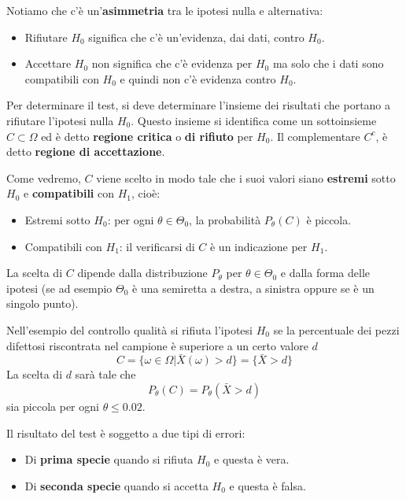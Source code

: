 \begin{observation}
	Notiamo che c'è un'\textbf{asimmetria} tra le ipotesi nulla e alternativa:
	\begin{itemize}
		\item Rifiutare $H_0$ significa che c'è un'evidenza, dai dati, contro $H_0$.
		\item Accettare $H_0$ non significa che c'è evidenza per $H_0$ ma solo che i dati sono
		      compatibili con $H_0$ e quindi non c'è evidenza contro $H_0$.
	\end{itemize}
\end{observation}

Per determinare il test, si deve determinare l'insieme dei risultati che portano a rifiutare
l'ipotesi nulla $H_0$. Questo insieme si identifica come un sottoinsieme $C \subset \Omega$ ed è
detto \textbf{regione critica} o \textbf{di rifiuto} per $H_0$. Il complementare $C^c$, è detto
\textbf{regione di accettazione}.

Come vedremo, $C$ viene scelto in modo tale che i suoi valori siano \textbf{estremi} sotto $H_0$ e
\textbf{compatibili} con $H_1$, cioè:
\begin{itemize}
	\item Estremi sotto $H_0$: per ogni $\theta \in \Theta_0$, la probabilità $P_\theta (C)$ è
	      piccola.
	\item Compatibili con $H_1$: il verificarsi di $C$ è un indicazione per $H_1$.
\end{itemize}
La scelta di $C$ dipende dalla distribuzione $P_\theta$ per $\theta \in \Theta_0$ e dalla forma
delle ipotesi (se ad esempio $\Theta_0$ è una semiretta a destra, a sinistra oppure se è un singolo
punto).

\begin{example}
	Nell'esempio del controllo qualità si rifiuta l'ipotesi $H_0$ se la percentuale dei pezzi
	difettosi riscontrata nel campione è superiore a un certo valore $d$
	\[ C = \{ \omega \in \Omega | \bar{X}(\omega) > d \} = \{ \bar{X} > d \} \]
	La scelta di $d$ sarà tale che
	\[ P_\theta(C) = P_\theta(\bar{X} > d) \]
	sia piccola per ogni $\theta \leq 0.02$.
\end{example}

Il risultato del test è soggetto a due tipi di errori:
\begin{itemize}
	\item Di \textbf{prima specie} quando si rifiuta $H_0$ e questa è vera.
	\item Di \textbf{seconda specie} quando si accetta $H_0$ e questa è falsa.
\end{itemize}

